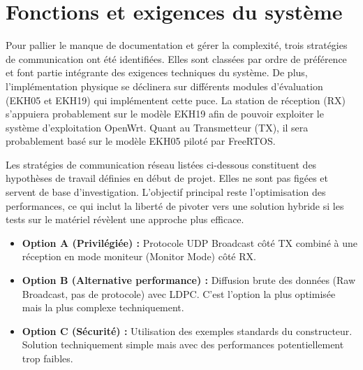 \section{Fonctions et exigences du système}
Pour pallier le manque de documentation et gérer la complexité, trois stratégies de 
communication ont été identifiées. Elles sont classées par ordre de préférence 
et font partie intégrante des exigences techniques du système. De plus, l'implémentation physique 
se déclinera sur différents modules d'évaluation (EKH05 et EKH19) qui implémentent cette puce.
La station de réception (RX) s'appuiera probablement sur le modèle EKH19 afin de pouvoir exploiter le système 
d'exploitation OpenWrt. Quant au Transmetteur (TX), il sera probablement basé sur le modèle EKH05 piloté par 
FreeRTOS.\newline

Les stratégies de communication réseau listées ci-dessous constituent des hypothèses de travail définies en début de 
projet. Elles ne sont pas figées et servent de base d'investigation. L'objectif principal reste l'optimisation des 
performances, ce qui inclut la liberté de pivoter vers une solution hybride si les tests sur le matériel révèlent 
une approche plus efficace.

\begin{itemize}
    \item \textbf{Option A (Privilégiée) :} Protocole UDP Broadcast côté TX
    combiné à une réception en mode moniteur (Monitor Mode) côté RX.
    \item \textbf{Option B (Alternative performance) :} Diffusion brute des données (Raw Broadcast, pas de protocole) 
    avec LDPC. C'est l'option la plus optimisée mais la plus complexe techniquement.
    \item \textbf{Option C (Sécurité) :} Utilisation des exemples standards du constructeur. Solution techniquement simple mais avec des performances potentiellement trop faibles.
\end{itemize}

\vspace{0.5cm}

